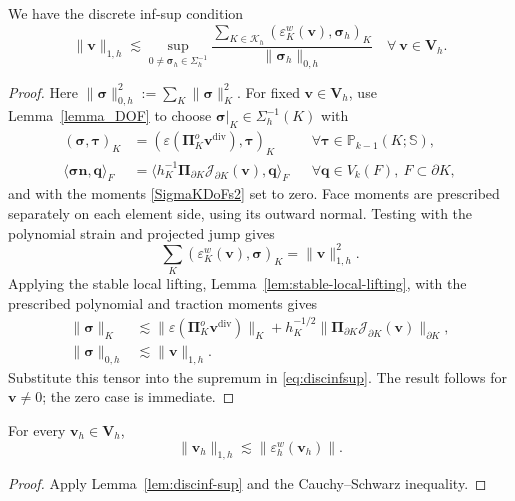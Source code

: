 \documentclass[review,hidelinks,onefignum,onetabnum]{siamart251216}
\begin{document}
\begin{lemma} \label{lem:discinf-sup}
We have the discrete inf-sup condition
\begin{equation}\label{eq:discinfsup}
\|\boldsymbol{v}\|_{1,h}\lesssim \sup_{0\ne\boldsymbol{\sigma}_h\in\Sigma_h^{-1}}
\frac{\sum_{K\in\mathcal{K}_h}(\varepsilon_K^w(\boldsymbol{v}), \boldsymbol{\sigma}_h)_K}{\|\boldsymbol{\sigma}_h\|_{0,h}}\quad\forall~\boldsymbol{v}\in\boldsymbol V_h.
\end{equation}
\end{lemma}
\begin{proof}
Here $\|\boldsymbol\sigma\|_{0,h}^2:=\sum_K\|\boldsymbol\sigma\|_K^2$.
For fixed $\boldsymbol v\in\boldsymbol V_h$, use Lemma~\ref{lemma_DOF}
to choose $\boldsymbol\sigma|_K\in\Sigma_h^{-1}(K)$ with
\[
\begin{aligned}
(\boldsymbol\sigma,\boldsymbol\tau)_K
&=(\varepsilon(\boldsymbol\Pi_K^o\boldsymbol v^{\operatorname{div}}),\boldsymbol\tau)_K
&&\forall\boldsymbol\tau\in\mathbb P_{k-1}(K;\mathbb S),\\
\langle\boldsymbol\sigma\boldsymbol n,\boldsymbol q\rangle_F
&=\langle h_K^{-1}\boldsymbol\Pi_{\partial K}\mathcal J_{\partial K}(\boldsymbol v),\boldsymbol q\rangle_F
&&\forall\boldsymbol q\in V_k(F),\ F\subset\partial K,
\end{aligned}
\]
and with the moments \eqref{SigmaKDoFs2} set to zero.
Face moments are prescribed separately on each element side, using its
outward normal. Testing with the polynomial strain and projected jump gives
\[
\sum_K(\varepsilon_K^w(\boldsymbol v),\boldsymbol\sigma)_K
=\|\boldsymbol v\|_{1,h}^2.
\]
Applying the stable local lifting, Lemma~\ref{lem:stable-local-lifting}, with the prescribed polynomial and traction moments gives
\[
\begin{aligned}
\|\boldsymbol\sigma\|_K
&\lesssim\|\varepsilon(\boldsymbol\Pi_K^o\boldsymbol v^{\operatorname{div}})\|_K
+h_K^{-1/2}\|\boldsymbol\Pi_{\partial K}\mathcal J_{\partial K}(\boldsymbol v)\|_{\partial K},\\
\|\boldsymbol\sigma\|_{0,h}&\lesssim\|\boldsymbol v\|_{1,h}.
\end{aligned}
\]
Substitute this tensor into the supremum in \eqref{eq:discinfsup}.
The result follows for $\boldsymbol v\ne0$; the zero case is immediate.
\end{proof}



\begin{lemma}\label{lem:coercive-strain}
For every $\boldsymbol v_h\in\boldsymbol V_h$,
\[
\|\boldsymbol v_h\|_{1,h}\lesssim\|\varepsilon_h^w(\boldsymbol v_h)\|.
\]
\end{lemma}
\begin{proof}
Apply Lemma~\ref{lem:discinf-sup} and the Cauchy--Schwarz inequality.
\end{proof}
\end{document}
